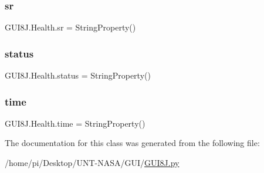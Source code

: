 \subsubsection{\texorpdfstring{sr}{sr}}
{\footnotesize\ttfamily G\+U\+I8\+J.\+Health.\+sr = String\+Property()\hspace{0.3cm}{\ttfamily [static]}}

\mbox{\label{classGUI8J_1_1Health_a28566a18c87f55e0b1e167becfcd7312}} 
\subsubsection{\texorpdfstring{status}{status}}
{\footnotesize\ttfamily G\+U\+I8\+J.\+Health.\+status = String\+Property()\hspace{0.3cm}{\ttfamily [static]}}

\mbox{\label{classGUI8J_1_1Health_a9ba91a4c82d6eeaa9d337472eb34d196}} 
\subsubsection{\texorpdfstring{time}{time}}
{\footnotesize\ttfamily G\+U\+I8\+J.\+Health.\+time = String\+Property()\hspace{0.3cm}{\ttfamily [static]}}



The documentation for this class was generated from the following file\+:\begin{DoxyCompactItemize}
\item 
/home/pi/\+Desktop/\+U\+N\+T-\/\+N\+A\+S\+A/\+G\+U\+I/\hyperlink{GUI8J_8py}{G\+U\+I8\+J.\+py}\end{DoxyCompactItemize}
